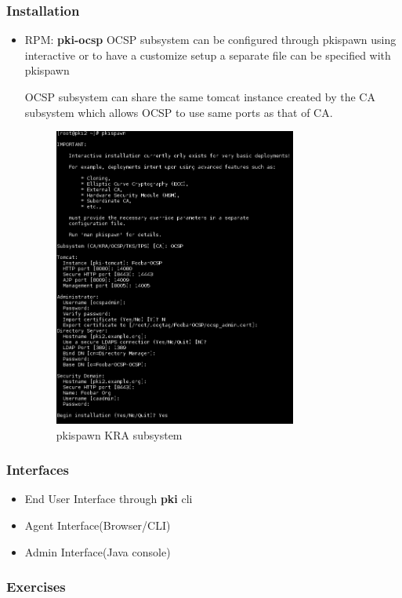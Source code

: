 \documentclass[a4paper]{article}
\begin{document}
\subsubsection{Installation}
    \begin{itemize}
        \item RPM: \textbf{pki-ocsp}
            OCSP subsystem can be configured through pkispawn using interactive or to have a customize
            setup a separate file can be specified with pkispawn

            OCSP subsystem can share the same tomcat instance created by the CA subsystem which allows
            OCSP to use same ports as that of CA.
            \begin{figure}[H]
                \centering
                \includegraphics[width=80mm]{pkispawn-ocsp.png}
                \caption{pkispawn KRA subsystem}
            \end{figure}
    \end{itemize}
\subsubsection{Interfaces}
\begin{itemize}
    \item End User Interface through \textbf{pki} cli
    \item Agent Interface(Browser/CLI)
    \item Admin Interface(Java console)
\end{itemize}
\subsubsection{Exercises}
\end{document}
